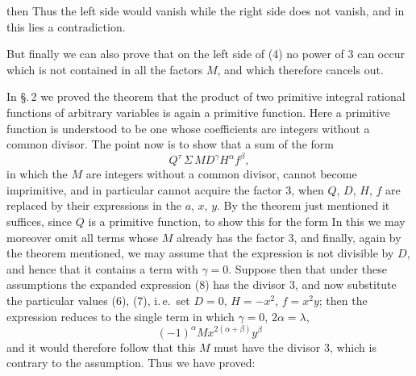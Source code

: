 then
Thus the left side would vanish while the right side does not
vanish, and in this lies a contradiction.

But finally we can also prove that on the left side of (4)
no power of 3 can occur which is not contained in all the
factors $M$, and which therefore cancels out.

In \S.\,2 we proved the theorem that the product of two
primitive integral rational functions of arbitrary variables is
again a primitive function. Here a primitive function is understood
to be one whose coefficients are integers without a common
divisor. The point now is to show that a sum of the form
\[
Q^\tau \, \Sigma \, M D^\gamma H^\alpha f^\beta,
\]
in which the $M$ are integers without a common divisor, cannot
become imprimitive, and in particular cannot acquire the factor 3,
when $Q$, $D$, $H$, $f$ are replaced by their expressions in the
$a$, $x$, $y$. By the theorem just mentioned it suffices, since $Q$
is a primitive function, to show this for the form
In this we may moreover omit all terms whose $M$ already has
the factor 3, and finally, again by the theorem mentioned, we
may assume that the expression is not divisible by $D$, and
hence that it contains a term with $\gamma = 0$.
Suppose then that under these assumptions the expanded
expression (8) has the divisor 3, and now substitute the
particular values (6), (7), i.\,e.\ set $D = 0$, $H = -x^2$,
$f = x^2 y$; then the expression reduces to the single term
in which $\gamma = 0$, $2\alpha = \lambda$,
\[
(-1)^\alpha M x^{2(\alpha + \beta)} y^\beta
\]
and it would therefore follow that this $M$ must have the
divisor 3, which is contrary to the assumption. Thus we have
proved:

